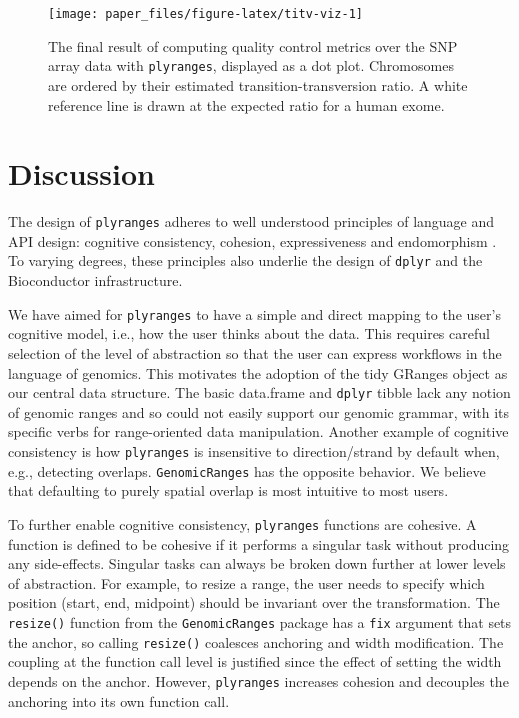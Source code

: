\documentclass[]{article}
\begin{document}
\begin{figure}

{\centering \texttt{[image: paper\_files/figure-latex/titv-viz-1]} 

}

\caption{The final result of computing quality control metrics over the SNP array data with \texttt{plyranges}, displayed as a dot plot. Chromosomes are ordered by their estimated transition-transversion ratio. A white reference line is drawn at the expected ratio for a human exome.}\label{fig:titv-viz}
\end{figure}

\section{Discussion}\label{discussion}

The design of \texttt{plyranges} adheres to well understood principles
of language and API design: cognitive consistency, cohesion,
expressiveness and endomorphism \cite{Green1996-qg}. To varying degrees,
these principles also underlie the design of \texttt{dplyr} and the
Bioconductor infrastructure.

We have aimed for \texttt{plyranges} to have a simple and direct mapping
to the user's cognitive model, i.e., how the user thinks about the data.
This requires careful selection of the level of abstraction so that the
user can express workflows in the language of genomics. This motivates
the adoption of the tidy GRanges object as our central data structure.
The basic data.frame and \texttt{dplyr} tibble lack any notion of
genomic ranges and so could not easily support our genomic grammar, with
its specific verbs for range-oriented data manipulation. Another example
of cognitive consistency is how \texttt{plyranges} is insensitive to
direction/strand by default when, e.g., detecting overlaps.
\texttt{GenomicRanges} has the opposite behavior. We believe that
defaulting to purely spatial overlap is most intuitive to most users.

To further enable cognitive consistency, \texttt{plyranges} functions
are cohesive. A function is defined to be cohesive if it performs a
singular task without producing any side-effects. Singular tasks can
always be broken down further at lower levels of abstraction. For
example, to resize a range, the user needs to specify which position
(start, end, midpoint) should be invariant over the transformation. The
\texttt{resize()} function from the \texttt{GenomicRanges} package has a
\texttt{fix} argument that sets the anchor, so calling \texttt{resize()}
coalesces anchoring and width modification. The coupling at the function
call level is justified since the effect of setting the width depends on
the anchor. However, \texttt{plyranges} increases cohesion and decouples
the anchoring into its own function call.
\end{document}
